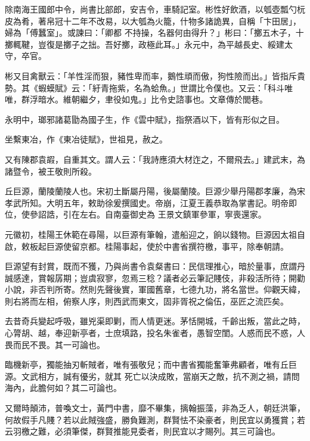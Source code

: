 \begin{pinyinscope}
 除南海王國郎中令，尚書比部郎，安吉令，車騎記室。彬性好飲酒，以瓠壺瓢勺杬皮為肴，著帛冠十二年不改易，以大瓠為火籠，什物多諸詭異，自稱「卞田居」，婦為「傅蠶室」。或諫曰：「卿都
 不持操，名器何由得升？」彬曰：「擲五木子，十擲輒鞬，豈復是擲子之拙。吾好擲，政極此耳。」永元中，為平越長史、綏建太守，卒官。



 彬又目禽獸云：「羊性淫而狠，豬性卑而率，鵝性頑而傲，狗性險而出。」皆指斥貴勢。其《蝦蟆賦》云：「紆青拖紫，名為蛤魚。」世謂比令僕也。又云：「科斗唯唯，群浮暗水。維朝繼夕，聿役如鬼。」比令史諮事也。文章傳於閭巷。



 永明中，瑯邪諸葛勖為國子生，作《雲中賦》，指祭酒以下，皆有形似之目。



 坐繫東冶，作《東冶徒賦》，世祖見，赦之。



 又有陳郡袁嘏，自重其文。謂人云：「我詩應須大材迮之，不爾飛去。」建武末，為諸暨令，被王敬則所殺。



 丘巨源，蘭陵蘭陵人也。宋初土斷屬丹陽，後屬蘭陵。巨源少舉丹陽郡孝廉，為宋孝武所知。大明五年，敕助徐爰撰國史。帝崩，江夏王義恭取為掌書記。明帝即位，使參詔誥，引在左右。自南臺御史為
 王景文鎮軍參軍，寧喪還家。



 元徽初，桂陽王休範在尋陽，以巨源有筆翰，遣船迎之，餉以錢物。巨源因太祖自啟，敕板起巨源使留京都。桂陽事起，使於中書省撰符檄，事平，除奉朝請。



 巨源望有封賞，既而不獲，乃與尚書令袁粲書曰：民信理推心，暗於量事，庶謂丹誠感達，賞報孱期；豈虞寂寥，忽焉三稔？議者必云筆記賤伎，非殺活所待；開勸小說，非否判所寄。然則先聲後實，軍國舊章，七德九功，將名當世。仰觀天緯，則右將而左相，俯察人序，則西武而東文，固非胥祝之倫伍，巫匠之流匹矣。



 去昔奇兵變起呼吸，雖兇渠即剿，而人情更迷。茅恬開城，千齡出叛，當此之時，心膂胡、越，奉迎新亭者，士庶填路，投名朱雀者，愚智空閨。人惑而民不惑，人畏而民不畏。其一可論也。



 臨機新亭，獨能抽刃斬賊者，唯有張敬兒；而中書省獨能奮筆弗顧者，唯有丘巨源。文武相方，誠有優劣，就其
 死亡以決成敗，當崩天之敵，抗不測之禍，請問海內，此膽何如？其二可論也。



 又爾時顛沛，普喚文士，黃門中書，靡不畢集，摛翰振藻，非為乏人，朝廷洪筆，何故假手凡賤？若以此賊強盛，勝負難測，群賢怯不染豪者，則民宜以勇獲賞；若云羽檄之難，必須筆傑，群賢推能見委者，則民宜以才賜列。其三可論也。




\end{pinyinscope}
